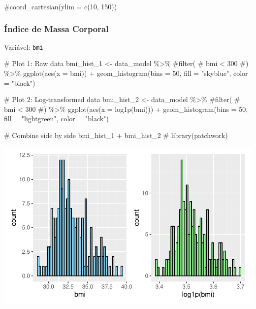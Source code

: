 \documentclass[
  12pt,
]{article}
\newenvironment{Shaded}{\begin{snugshade}}{\end{snugshade}}
\newcommand{\AttributeTok}[1]{\textcolor[rgb]{0.40,0.45,0.13}{#1}}
\newcommand{\CommentTok}[1]{\textcolor[rgb]{0.37,0.37,0.37}{#1}}
\newcommand{\DecValTok}[1]{\textcolor[rgb]{0.68,0.00,0.00}{#1}}
\newcommand{\FunctionTok}[1]{\textcolor[rgb]{0.28,0.35,0.67}{#1}}
\newcommand{\NormalTok}[1]{\textcolor[rgb]{0.00,0.23,0.31}{#1}}
\newcommand{\OtherTok}[1]{\textcolor[rgb]{0.00,0.23,0.31}{#1}}
\newcommand{\SpecialCharTok}[1]{\textcolor[rgb]{0.37,0.37,0.37}{#1}}
\newcommand{\StringTok}[1]{\textcolor[rgb]{0.13,0.47,0.30}{#1}}
\begin{document}
\begin{Shaded}
\begin{Highlighting}[]
    \CommentTok{\#coord\_cartesian(ylim = c(10, 150))}
\end{Highlighting}
\end{Shaded}

\subsubsection{Índice de Massa
Corporal}\label{uxedndice-de-massa-corporal}

Variável: \texttt{bmi}

\begin{Shaded}
\begin{Highlighting}[]
\CommentTok{\# Plot 1: Raw data}
\NormalTok{bmi\_hist\_1 }\OtherTok{\textless{}{-}}\NormalTok{ data\_model }\SpecialCharTok{\%\textgreater{}\%} 
    \CommentTok{\#filter(}
    \CommentTok{\#    bmi \textless{} 300}
    \CommentTok{\#) \%\textgreater{}\% }
    \FunctionTok{ggplot}\NormalTok{(}\FunctionTok{aes}\NormalTok{(}\AttributeTok{x =}\NormalTok{ bmi)) }\SpecialCharTok{+} 
    \FunctionTok{geom\_histogram}\NormalTok{(}\AttributeTok{bins =} \DecValTok{50}\NormalTok{, }\AttributeTok{fill =} \StringTok{"skyblue"}\NormalTok{, }\AttributeTok{color =} \StringTok{"black"}\NormalTok{)}

\CommentTok{\# Plot 2: Log{-}transformed data}
\NormalTok{bmi\_hist\_2 }\OtherTok{\textless{}{-}}\NormalTok{ data\_model }\SpecialCharTok{\%\textgreater{}\%} 
    \CommentTok{\#filter(}
    \CommentTok{\#    bmi \textless{} 300}
    \CommentTok{\#) \%\textgreater{}\%}
    \FunctionTok{ggplot}\NormalTok{(}\FunctionTok{aes}\NormalTok{(}\AttributeTok{x =} \FunctionTok{log1p}\NormalTok{(bmi))) }\SpecialCharTok{+} 
    \FunctionTok{geom\_histogram}\NormalTok{(}\AttributeTok{bins =} \DecValTok{50}\NormalTok{, }\AttributeTok{fill =} \StringTok{"lightgreen"}\NormalTok{, }\AttributeTok{color =} \StringTok{"black"}\NormalTok{)}

\CommentTok{\# Combine side by side}
\NormalTok{bmi\_hist\_1 }\SpecialCharTok{+}\NormalTok{ bmi\_hist\_2 }\CommentTok{\# library(patchwork)}
\end{Highlighting}
\end{Shaded}

\includegraphics{Outcomes_files/figure-pdf/bmi_1-1.pdf}
\end{document}
